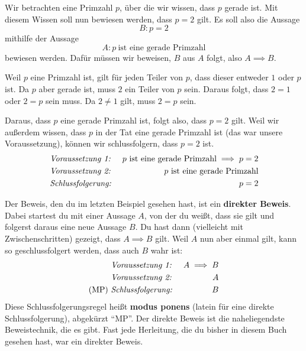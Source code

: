 \documentclass[../../main.tex]{subfiles}
\begin{document}
\begin{example}{}
    Wir betrachten eine Primzahl $p$, über die wir wissen, dass $p$ gerade ist. Mit diesem Wissen soll nun bewiesen werden, dass $p=2$ gilt. Es soll also die Aussage
    \[B:p=2\]
    mithilfe der Aussage
    \[A:p~\text{ist~eine~gerade~Primzahl}\]
    bewiesen werden. Dafür müssen wir beweisen, $B$ aus $A$ folgt, also $A\implies B$.

    Weil $p$ eine Primzahl ist, gilt für jeden Teiler von $p$, dass dieser entweder $1$ oder $p$ ist. Da $p$ aber gerade ist, muss $2$ ein Teiler von $p$ sein. Daraus folgt, dass $2=1$ oder $2=p$ sein muss. Da $2\neq 1$ gilt, muss $2=p$ sein.

    Daraus, dass $p$ eine gerade Primzahl ist, folgt also, dass $p=2$ gilt. Weil wir außerdem wissen, dass $p$ in der Tat eine gerade Primzahl ist (das war unsere Voraussetzung), können wir schlussfolgern, dass $p=2$ ist.
    \begin{align*}
        &\text{\emph{Voraussetzung~1:}}~&p~\text{ist~eine~gerade~Primzahl} \implies p=2\\
        &\text{\emph{Voraussetzung~2:}}~&p~\text{ist~eine~gerade~Primzahl}\\
        &\text{\emph{Schlussfolgerung:}}~&p=2
    \end{align*}
\end{example}

Der Beweis, den du im letzten Beispiel gesehen hast, ist ein \textbf{direkter Beweis}. Dabei startest du mit einer Aussage $A$, von der du weißt, dass sie gilt und folgerst daraus eine neue Aussage $B$. Du hast dann (vielleicht mit Zwischenschritten) gezeigt, dass $A \implies B$ gilt. Weil $A$ nun aber einmal gilt, kann so geschlussfolgert werden, dass auch $B$ wahr ist:
\begin{align*}
    &\text{\emph{Voraussetzung~1:}}~&A \implies B\\
    &\text{\emph{Voraussetzung~2:}}~&A\\
    (\text{MP})~&\text{\emph{Schlussfolgerung:}}~&B
\end{align*}
Diese Schlussfolgerungsregel heißt \textbf{modus ponens} (latein für eine direkte Schlussfolgerung), abgekürzt \enquote{MP}. Der direkte Beweis ist die naheliegendste Beweistechnik, die es gibt. Fast jede Herleitung, die du bisher in diesem Buch gesehen hast, war ein direkter Beweis.
\end{document}
